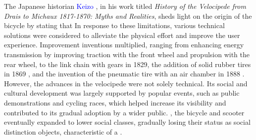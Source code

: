 \begin{refsegment}
{    The Japanese historian \textcolor{blue}{Keizo} \textcolor{blue}{\textcite[149]{kobayashi_histoire_1993}}, in his work titled \textsl{History of the Velocipede from Drais to Michaux 1817-1870: Myths and Realities}, sheds light on the origin of the bicycle by stating that  In response to these limitations, various technical solutions were considered to alleviate the physical effort and improve the user experience. Improvement inventions multiplied, ranging from enhancing energy transmission by improving traction with the front wheel and propulsion with the rear wheel, to the link chain with gears in 1829, the addition of solid rubber tires in 1869 \textcolor{blue}{\autocites{inpi_draisienne_2020}[38]{jouenne_quest-ce_2022}}, and the invention of the pneumatic tire with an air chamber in 1888 \textcolor{blue}{\autocite[14]{papon_retour_2012}}. However, the advances in the velocipede were not solely technical. Its social and cultural development was largely supported by popular events, such as public demonstrations and cycling races, which helped increase its visibility and contributed to its gradual adoption by a wider public.
}, the bicycle and scooter eventually expanded to lower social classes, gradually losing their status as social distinction objects, characteristic of a .%


\end{refsegment}
